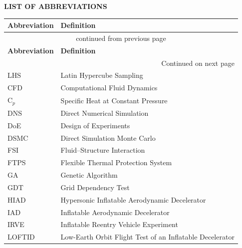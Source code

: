 \clearpage
{}
{}
\begin{center}
{\bfseries \Large LIST OF ABBREVIATIONS}
\end{center}
\vspace{1em}

\begingroup
\setlength{\LTleft}{0.5cm}
\setlength{\LTright}{0.5cm}
\renewcommand{\arraystretch}{1.05}
\begin{longtable}{|p{4.0cm}|p{8.2cm}|}
\hline
    \textbf{Abbreviation} & \textbf{Definition}            \\
\hline
\endfirsthead
\multicolumn{2}{|c|}{continued from previous page} \\
\hline
    \textbf{Abbreviation} & \textbf{Definition}            \\
\hline
\endhead
\hline \multicolumn{2}{|r|}{{Continued on next page}} \\ \hline
\endfoot
\hline
\endlastfoot
    LHS         & Latin Hypercube Sampling              \\
    CFD         & Computational Fluid Dynamics          \\
    C$_p$       & Specific Heat at Constant Pressure     \\
    DNS         & Direct Numerical Simulation            \\
    DoE         & Design of Experiments                  \\
    DSMC        & Direct Simulation Monte Carlo          \\
    FSI         & Fluid--Structure Interaction            \\
    FTPS        & Flexible Thermal Protection System     \\
    GA          & Genetic Algorithm                      \\
    GDT         & Grid Dependency Test                   \\
    HIAD        & Hypersonic Inflatable Aerodynamic Decelerator \\
    IAD         & Inflatable Aerodynamic Decelerator     \\
    IRVE        & Inflatable Reentry Vehicle Experiment  \\
    LOFTID      & Low-Earth Orbit Flight Test of an Inflatable Decelerator \\

\end{longtable}

